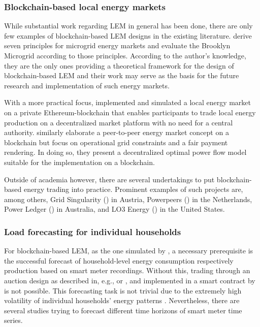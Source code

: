 \subsubsection{Blockchain-based local energy markets}

While substantial work regarding LEM in general has been done, there are only few examples of blockchain-based LEM designs in the existing literature. \citet{Mengelkamp:2018b} derive seven principles for microgrid energy markets and evaluate the Brooklyn Microgrid according to those principles. According to the author's knowledge, they are the only ones providing a theoretical framework for the design of blockchain-based LEM and their work may serve as the basis for the future research and implementation of such energy markets.

With a more practical focus, \citet{Mengelkamp:2018a} implemented and simulated a local energy market on a private Ethereum-blockchain that enables participants to trade local energy production on a decentralized market platform with no need for a central authority. \citet{Münsing:2017} similarly elaborate a peer-to-peer energy market concept on a blockchain but focus on operational grid constraints and a fair payment rendering. In doing so, they present a decentralized optimal power flow model suitable for the implementation on a blockchain.

Outside of academia however, there are several undertakings to put blockchain-based energy trading into practice. Prominent examples of such projects are, among others, Grid Singularity () in Austria, Powerpeers () in the Netherlands, Power Ledger () in Australia, and LO3 Energy () in the United States.



\newpage
\subsubsection{Load forecasting for individual households}


For blockchain-based LEM, as the one simulated by \citet{Mengelkamp:2018a}, a necessary prerequisite is the successful forecast of household-level energy consumption respectively production based on smart meter recordings. Without this, trading through an auction design as described in, e.g., \citet{Block:2008} or \citet{Buchmann:2013}, and implemented in a smart contract by \citet{Mengelkamp:2018a} is not possible. This forecasting task is not trivial due to the extremely high volatility of individual households' energy patterns \citep{Wang:2018}. Nevertheless, there are several studies trying to forecast different time horizons of smart meter time series.


